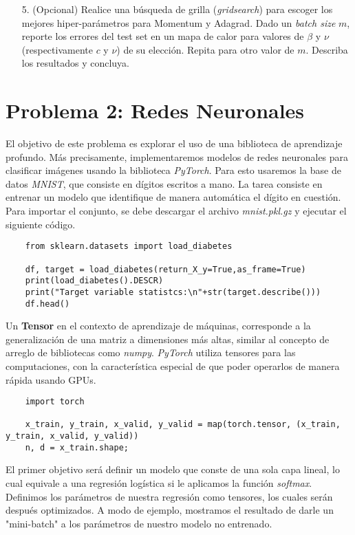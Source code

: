 \begin{enumerate}
    \item[5.] (Opcional) Realice una búsqueda de grilla (\textit{gridsearch}) para escoger los mejores hiper-parámetros para Momentum y Adagrad. Dado un \textit{batch size} $m$, reporte los errores del test set en un mapa de calor para valores de $\beta$ y $\nu$ (respectivamente $c$ y $\nu$) de su elección. Repita para otro valor de $m$. Describa los resultados y concluya.
    
\end{enumerate}

\section*{Problema 2: Redes Neuronales}
El objetivo de este problema es explorar el uso de una biblioteca de aprendizaje profundo. Más precisamente, implementaremos modelos de redes neuronales para clasificar imágenes usando la biblioteca \textit{PyTorch}. Para esto usaremos la base de datos \textit{MNIST}, que consiste en dígitos escritos a mano. La tarea consiste en entrenar un modelo que identifique de manera automática el dígito en cuestión. Para importar el conjunto, se debe descargar el archivo \textit{mnist.pkl.gz} y ejecutar el siguiente código.

\begin{verbatim}
    from sklearn.datasets import load_diabetes

    df, target = load_diabetes(return_X_y=True,as_frame=True)
    print(load_diabetes().DESCR)
    print("Target variable statistcs:\n"+str(target.describe()))
    df.head()
\end{verbatim}

Un \textbf{Tensor} en el contexto de aprendizaje de máquinas, corresponde a la generalización de una matriz a dimensiones más altas, similar al concepto de arreglo de bibliotecas como \textit{numpy}. \textit{PyTorch} utiliza tensores para las computaciones, con la característica especial de que poder operarlos de manera rápida usando GPUs.

\begin{verbatim}
    import torch

    x_train, y_train, x_valid, y_valid = map(torch.tensor, (x_train, y_train, x_valid, y_valid))
    n, d = x_train.shape;
\end{verbatim}

El primer objetivo será definir un modelo que conste de una sola capa lineal, lo cual equivale a una regresión logística si le aplicamos la función \textit{softmax}. Definimos los parámetros de nuestra regresión como tensores, los cuales serán después optimizados. A modo de ejemplo, mostramos el resultado de darle un "mini-batch" a los parámetros de nuestro modelo no entrenado.

